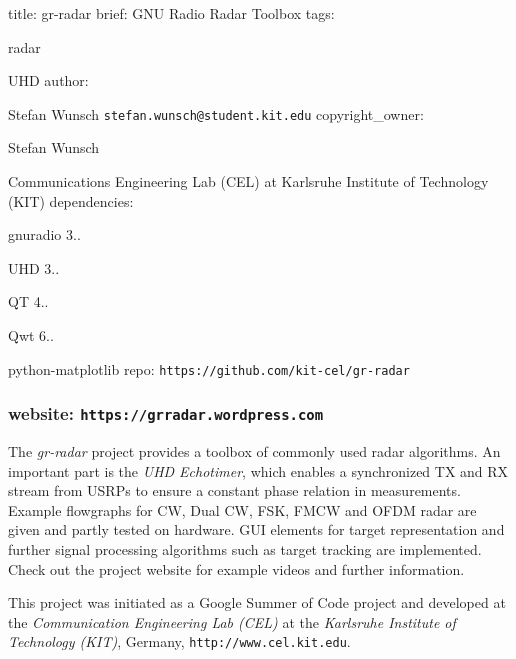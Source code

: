 title\+: gr-\/radar brief\+: G\+NU Radio Radar Toolbox tags\+:
\begin{DoxyItemize}
\item radar
\item U\+HD author\+:
\item Stefan Wunsch {\tt stefan.\+wunsch@student.\+kit.\+edu} copyright\+\_\+owner\+:
\item Stefan Wunsch
\item Communications Engineering Lab (C\+EL) at Karlsruhe Institute of Technology (K\+IT) dependencies\+:
\item gnuradio 3..
\item U\+HD 3..
\item QT 4..
\item Qwt 6..
\item python-\/matplotlib repo\+: {\tt https\+://github.\+com/kit-\/cel/gr-\/radar} \subsubsection*{website\+: {\tt https\+://grradar.\+wordpress.\+com} }
\end{DoxyItemize}

The {\itshape gr-\/radar} project provides a toolbox of commonly used radar algorithms. An important part is the {\itshape U\+HD Echotimer}, which enables a synchronized TX and RX stream from U\+S\+R\+Ps to ensure a constant phase relation in measurements. Example flowgraphs for CW, Dual CW, F\+SK, F\+M\+CW and O\+F\+DM radar are given and partly tested on hardware. G\+UI elements for target representation and further signal processing algorithms such as target tracking are implemented. Check out the project website for example videos and further information.

This project was initiated as a Google Summer of Code project and developed at the {\itshape Communication Engineering Lab (C\+EL)} at the {\itshape Karlsruhe Institute of Technology (K\+IT)}, Germany, {\tt http\+://www.\+cel.\+kit.\+edu}. 